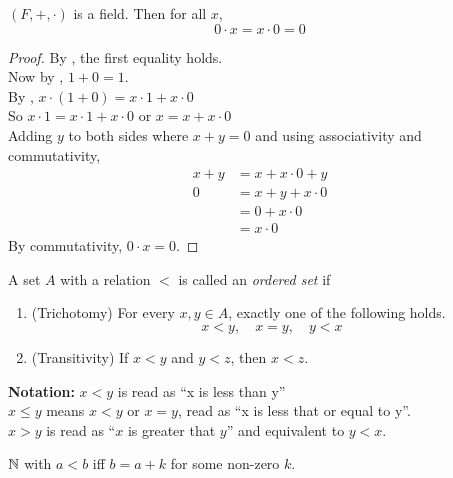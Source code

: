 \begin{thm} \label{thm:field:0x=0}
    $(F, +, \cdot)$ is a field. Then for all $x$, \[
        0 \cdot x = x \cdot 0 = 0
    \]
\end{thm}
\begin{proof}
    By , the first equality holds. \\
    Now by , $1 + 0 = 1$. \\
    By , $x \cdot (1 + 0) = x \cdot 1 + x \cdot 0$ \\
    So $x \cdot 1 = x \cdot 1 + x \cdot 0$ or $x = x + x \cdot 0$ \\
    Adding $y$ to both sides where $x + y = 0$  and using associativity and commutativity,
    \begin{align*}
        x + y &= x + x \cdot 0 + y \\ 
        0 &= x + y + x \cdot 0 \\
        &= 0 + x \cdot 0 \\
        &= x \cdot 0
    \end{align*}
    By commutativity, $0 \cdot x = 0$.
\end{proof}

\begin{defn} \label{defn:order}
    A set $A$ with a relation $<$ is called an \emph{ordered set} if
    \begin{enumerate}[label=(O\arabic*)]
        \item \label{defn:order:trichotomy}
            (Trichotomy) For every $x, y \in A$, exactly one of the following holds. \[
                x < y, \quad x = y, \quad y < x
            \]
        \item \label{defn:order:transitivity}
            (Transitivity) If $x < y$ and $y < z$, then $x < z$.
        \setcounter{temp}{\value{enumi}}
    \end{enumerate}
    \textbf{Notation:} $x < y$ is read as ``x is less than y'' \\
    $x \leq y$ means $x < y$ or $x = y$, read as ``x is less that or equal to y''. \\
    $x > y$ is read as ``$x$ is greater that $y$'' and equivalent to $y < x$.
\end{defn}
\begin{example}
    $\mathbb{N}$ with $a < b$ iff $b = a + k$ for some non-zero $k$.
\end{example}

